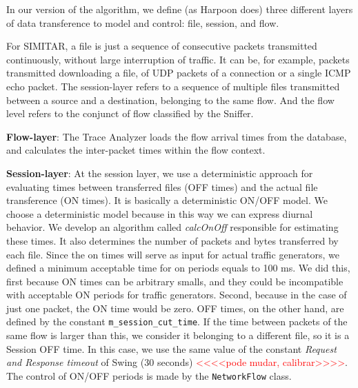 In our version of the algorithm, we define (as Harpoon does) three different layers of data transference to model and control: file, session, and flow. 

For SIMITAR, a file is just a sequence of consecutive packets transmitted continuously, without large interruption of traffic. It can be, for example, packets transmitted downloading a file, of UDP packets of a connection or a single ICMP echo packet. The session-layer refers to a sequence of multiple files transmitted between a source and a destination, belonging to the same flow.  And the flow level refers to the conjunct of flow classified by the Sniffer.  

\textbf{Flow-layer}: The Trace Analyzer loads the flow arrival times from the database, and calculates the inter-packet times within the flow context. 

\textbf{Session-layer}: At the session layer, we use a deterministic approach for evaluating times between transferred files (OFF times) and the actual file transference (ON times). It is basically a deterministic ON/OFF model. We choose a deterministic model because in this way we can express diurnal behavior\cite{harpoon-paper}.  We develop an algorithm called \textit{calcOnOff} responsible for estimating these times. It also determines the number of packets and bytes transferred by each file. Since the on times will serve as input for actual traffic generators, we defined a minimum acceptable time for on periods equals to 100 ms. We did this, first because ON times can be arbitrary smalls, and they could be incompatible with acceptable ON periods for traffic generators. Second, because in the case of just one packet, the ON time would be zero. OFF times, on the other hand, are defined by the constant \texttt{m\_session\_cut\_time}. If the time between packets of the same flow is larger than this, we consider it belonging to a different file, so it is a Session OFF time. In this case, we use the same value of the constant \textit{Request and Response timeout} of Swing\cite{swing-paper} (30 seconds) \textcolor{red}{<<<<pode mudar, calibrar>>>>}.
The control of ON/OFF periods is made by the \texttt{NetworkFlow} class.

